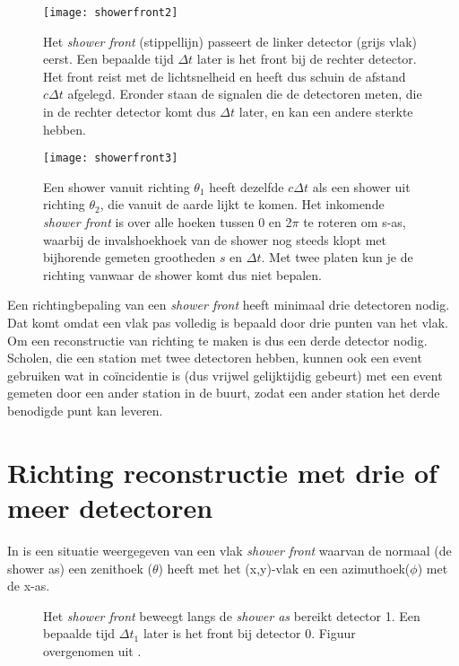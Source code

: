 \begin{figure}
    \centering
    \texttt{[image: showerfront2]}
    \caption{Het \emph{shower front} (stippellijn) passeert de linker
             detector (grijs vlak) eerst. Een bepaalde tijd $\Delta t$
             later is het front bij de rechter detector. Het front reist
             met de lichtsnelheid en heeft dus schuin de afstand
             $c\Delta t$ afgelegd. Eronder staan de signalen die de
             detectoren meten, die in de rechter detector komt dus
             $\Delta t$ later, en kan een andere sterkte hebben.}
   \label{fig:showerfront2}
\end{figure}

\begin{figure}
    \centering
    \texttt{[image: showerfront3]}
    \caption{Een shower vanuit richting $\theta_1$ heeft dezelfde
             $c\Delta t$ als een shower uit richting $\theta_2$, die
             vanuit de aarde lijkt te komen. Het inkomende \emph{shower
             front} is over alle hoeken tussen 0 en 2$\pi$ te roteren om
             s-as, waarbij de invalshoekhoek van de shower nog steeds
             klopt met bijhorende gemeten grootheden $s$ en $\Delta t$.
             Met twee platen kun je de richting vanwaar de shower komt
             dus niet bepalen.}
   \label{fig:showerfront3}
\end{figure}

Een richtingbepaling van een \emph{shower front} heeft minimaal drie
detectoren nodig. Dat komt omdat een vlak pas volledig is bepaald door drie punten van het vlak. Om een reconstructie van
richting te maken is dus een derde detector nodig. Scholen, die een
station met twee detectoren hebben, kunnen ook een event gebruiken wat
in coïncidentie is (dus vrijwel gelijktijdig gebeurt) met een event gemeten door een ander station in de
buurt, zodat een ander station het derde benodigde punt kan leveren.


\section{Richting reconstructie met drie of meer detectoren}

In  is een situatie weergegeven van een vlak
\emph{shower front} waarvan de normaal (de shower as) een zenithoek
($\theta$) heeft met het (x,y)-vlak en een azimuthoek($\phi$) met de
x-as.

\begin{figure}
    \centering
    
    \caption{Het \emph{shower front} beweegt langs de \emph{shower as}
             bereikt detector 1. Een bepaalde tijd $\Delta t_1$ later is
             het front bij detector 0. Figuur overgenomen uit
             \cite{Fokkema}.}
  \label{fig:frontthesis}
\end{figure}

